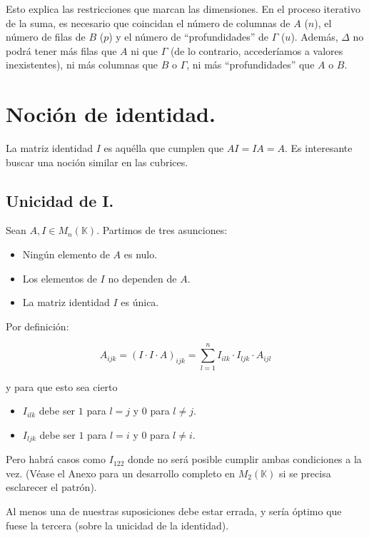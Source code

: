 \documentclass[a4paper, titlepage]{article}
\begin{document}
Esto explica las restricciones que marcan las dimensiones. En el proceso iterativo de la suma, es necesario que coincidan el número de columnas de $A$ ($n$), el número de filas de $B$ ($p$) y el número de ``profundidades'' de $\Gamma$ ($u$). Además, $\Delta$ no podrá tener más filas que $A$ ni que $\Gamma$ (de lo contrario, accederíamos a valores inexistentes), ni más columnas que $B$ o $\Gamma$, ni más ``profundidades'' que $A$ o $B$.

\section{Noción de identidad.}

La matriz identidad $I$ es aquélla que cumplen que $AI = IA = A$. Es interesante buscar una noción similar en las cubrices.

\subsection{Unicidad de I.}

Sean $A, I \in M_{n} (\mathbb{K})$. Partimos de tres asunciones:

\begin{itemize}
	\item Ningún elemento de $A$ es nulo.
	\item Los elementos de $I$ no dependen de $A$.
	\item La matriz identidad $I$ es única.
\end{itemize}

Por definición:

$$A_{ijk} = (I \cdot I \cdot A)_{ijk} = \sum\limits_{l=1}^{n} I_{ilk} \cdot I_{ljk} \cdot A_{ijl}$$

y para que esto sea cierto

\begin{itemize}
	\item $I_{ilk}$ debe ser $1$ para $l = j$ y $0$ para $l \neq j$. 
	\item $I_{ljk}$ debe ser $1$ para $l = i$ y $0$ para $l \neq i$.
\end{itemize}

Pero habrá casos como $I_{122}$ donde no será posible cumplir ambas condiciones a la vez. (Véase el Anexo para un desarrollo completo en $M_2 (\mathbb{K})$ si se precisa esclarecer el patrón).

Al menos una de nuestras suposiciones debe estar errada, y sería óptimo que fuese la tercera (sobre la unicidad de la identidad).
\end{document}
